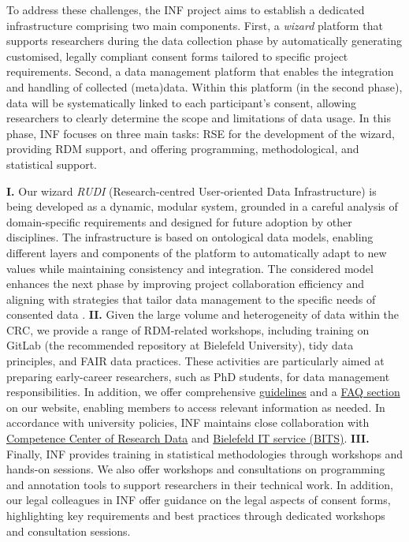 \documentclass{eceasst}
\begin{document}
To address these challenges, the INF project aims to establish a dedicated infrastructure comprising two main components.
First, a \textit{wizard} platform that supports researchers during the data collection phase by automatically generating customised, legally compliant consent forms tailored to specific project requirements.
Second, a data management platform that enables the integration and handling of collected (meta)data. Within this platform (in the second phase), data will be systematically linked to each participant's consent, allowing researchers to clearly determine the scope and limitations of data usage. In this phase, INF focuses on three main tasks: RSE for the development of the wizard, providing RDM support, and offering programming, methodological, and statistical support.

\textbf{I.} Our wizard \textit{RUDI} (Research-centred User-oriented Data Infrastructure) is being developed as a dynamic, modular system, grounded in a careful analysis of domain-specific requirements and designed for future adoption by other disciplines.
The infrastructure is based on ontological data models, enabling different layers and components of the platform to automatically adapt to new values while maintaining consistency and integration.
The considered model enhances the next phase by improving project collaboration efficiency and aligning with strategies that tailor data management to the specific needs of consented data \cite{Mohammadietal2026}. %
\textbf{II.} Given the large volume and heterogeneity of data within the CRC, we provide a range of RDM-related workshops, including training on GitLab (the recommended repository at Bielefeld University), tidy data principles, and FAIR data practices. These activities are particularly aimed at preparing early-career researchers, such as PhD students, for data management responsibilities. In addition, we offer comprehensive \href{https://crc1646.pages.ub.uni-bielefeld.de/inf/website/wiki/site/index.html}{guidelines} and a \href{https://crc1646.pages.ub.uni-bielefeld.de/inf/website/faq.html}{FAQ section} on our website, enabling members to access relevant information as needed. In accordance with university policies, INF maintains close collaboration with \href{https://www.uni-bielefeld.de/ub/digital/forschungsdaten/kompetenzzentrum/}{Competence Center of Research Data} and \href{https://www.uni-bielefeld.de/einrichtungen/bits/ueber-uns/index.xml}{Bielefeld IT service (BITS)}.
\textbf{III.} Finally, INF provides training in statistical methodologies through workshops and hands-on sessions. We also offer workshops and consultations on programming and annotation tools to support researchers in their technical work. In addition, our legal colleagues in INF offer guidance on the legal aspects of consent forms, highlighting key requirements and best practices through dedicated workshops and consultation sessions.
\end{document}
